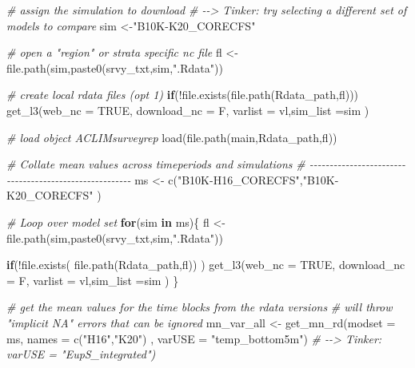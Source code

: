 \documentclass[
]{article}
\newenvironment{Shaded}{\begin{snugshade}}{\end{snugshade}}
\newcommand{\AttributeTok}[1]{\textcolor[rgb]{0.77,0.63,0.00}{#1}}
\newcommand{\CommentTok}[1]{\textcolor[rgb]{0.56,0.35,0.01}{\textit{#1}}}
\newcommand{\ConstantTok}[1]{\textcolor[rgb]{0.00,0.00,0.00}{#1}}
\newcommand{\ControlFlowTok}[1]{\textcolor[rgb]{0.13,0.29,0.53}{\textbf{#1}}}
\newcommand{\FunctionTok}[1]{\textcolor[rgb]{0.00,0.00,0.00}{#1}}
\newcommand{\NormalTok}[1]{#1}
\newcommand{\OtherTok}[1]{\textcolor[rgb]{0.56,0.35,0.01}{#1}}
\newcommand{\SpecialCharTok}[1]{\textcolor[rgb]{0.00,0.00,0.00}{#1}}
\newcommand{\StringTok}[1]{\textcolor[rgb]{0.31,0.60,0.02}{#1}}
\begin{document}
\begin{Shaded}
\begin{Highlighting}[]
    \CommentTok{\# assign the simulation to download}
    \CommentTok{\# {-}{-}\textgreater{} Tinker: try selecting a different set of models to compare}
\NormalTok{    sim        }\OtherTok{\textless{}{-}}\StringTok{"B10K{-}K20\_CORECFS"} 
    
    \CommentTok{\# open a "region" or strata specific nc file}
\NormalTok{    fl         }\OtherTok{\textless{}{-}} \FunctionTok{file.path}\NormalTok{(sim,}\FunctionTok{paste0}\NormalTok{(srvy\_txt,sim,}\StringTok{".Rdata"}\NormalTok{))}
     
    \CommentTok{\# create local rdata files (opt 1)}
    \ControlFlowTok{if}\NormalTok{(}\SpecialCharTok{!}\FunctionTok{file.exists}\NormalTok{(}\FunctionTok{file.path}\NormalTok{(Rdata\_path,fl)))}
      \FunctionTok{get\_l3}\NormalTok{(}\AttributeTok{web\_nc =} \ConstantTok{TRUE}\NormalTok{, }\AttributeTok{download\_nc =}\NormalTok{ F,}
          \AttributeTok{varlist =}\NormalTok{ vl,}\AttributeTok{sim\_list =}\NormalTok{sim )}
    
    \CommentTok{\# load object \textquotesingle{}ACLIMsurveyrep\textquotesingle{}}
    \FunctionTok{load}\NormalTok{(}\FunctionTok{file.path}\NormalTok{(main,Rdata\_path,fl))   }
    
    
    \CommentTok{\# Collate mean values across timeperiods and simulations}
    \CommentTok{\# {-}{-}{-}{-}{-}{-}{-}{-}{-}{-}{-}{-}{-}{-}{-}{-}{-}{-}{-}{-}{-}{-}{-}{-}{-}{-}{-}{-}{-}{-}{-}{-}{-}{-}{-}{-}{-}{-}{-}{-}{-}{-}{-}{-}{-}{-}{-}{-}{-}{-}{-}{-}{-}{-}{-}}
\NormalTok{    ms }\OtherTok{\textless{}{-}} \FunctionTok{c}\NormalTok{(}\StringTok{"B10K{-}H16\_CORECFS"}\NormalTok{,}\StringTok{"B10K{-}K20\_CORECFS"}\NormalTok{ )}
   
    \CommentTok{\# Loop over model set}
    \ControlFlowTok{for}\NormalTok{(sim }\ControlFlowTok{in}\NormalTok{ ms)\{}
\NormalTok{     fl         }\OtherTok{\textless{}{-}} \FunctionTok{file.path}\NormalTok{(sim,}\FunctionTok{paste0}\NormalTok{(srvy\_txt,sim,}\StringTok{".Rdata"}\NormalTok{))}
     
    \ControlFlowTok{if}\NormalTok{(}\SpecialCharTok{!}\FunctionTok{file.exists}\NormalTok{( }\FunctionTok{file.path}\NormalTok{(Rdata\_path,fl)) )}
      \FunctionTok{get\_l3}\NormalTok{(}\AttributeTok{web\_nc =} \ConstantTok{TRUE}\NormalTok{, }\AttributeTok{download\_nc =}\NormalTok{ F,}
          \AttributeTok{varlist =}\NormalTok{ vl,}\AttributeTok{sim\_list =}\NormalTok{sim )}
\NormalTok{    \}}
      
    \CommentTok{\# get the mean values for the time blocks from the rdata versions}
    \CommentTok{\# will throw "implicit NA" errors that can be ignored}
\NormalTok{    mn\_var\_all }\OtherTok{\textless{}{-}} \FunctionTok{get\_mn\_rd}\NormalTok{(}\AttributeTok{modset =}\NormalTok{ ms,}
                            \AttributeTok{names  =} \FunctionTok{c}\NormalTok{(}\StringTok{"H16"}\NormalTok{,}\StringTok{"K20"}\NormalTok{) ,}
                            \AttributeTok{varUSE =} \StringTok{"temp\_bottom5m"}\NormalTok{)}
    \CommentTok{\# {-}{-}\textgreater{} Tinker:           varUSE = "EupS\_integrated") }
    

\end{Highlighting}
\end{Shaded}
\end{document}
